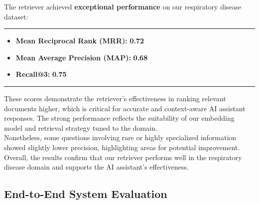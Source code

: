 The retriever achieved \textbf{exceptional performance} on our respiratory disease dataset:
\vspace{0.5em}
\hrule
\begin{itemize}
    \item \textbf{Mean Reciprocal Rank (MRR):} \textbf{0.72} 
    \item \textbf{Mean Average Precision (MAP):} \textbf{0.68}
    \item \textbf{Recall@3:} \textbf{0.75}
\end{itemize}
\hrule
\vspace{0.5em}

These scores demonstrate the retriever’s effectiveness in ranking relevant documents higher, which is critical for accurate and context-aware AI assistant responses. The strong performance reflects the suitability of our embedding model and retrieval strategy tuned to the domain.\\
Nonetheless, some questions involving rare or highly specialized information showed slightly lower precision, highlighting areas for potential improvement. Overall, the results confirm that our retriever performs well in the respiratory disease domain and supports the AI assistant’s effectiveness.

\subsection{End-to-End System Evaluation}
\label{subsec:e2e-eval}

